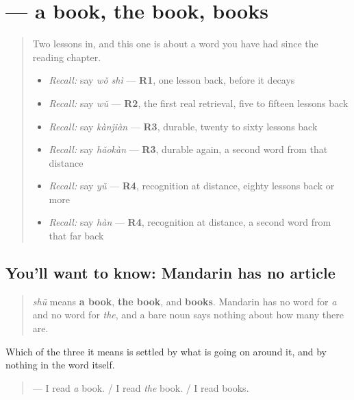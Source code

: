 \section[\texorpdfstring{\zh{书} (shū)}{书 (shū)}]{ — a book, the book, books}

\label{lesson:ZH-C22-wuguanci}



\begin{quote}
Two lessons in, and this one is about a word you have had since the reading chapter.

\begin{itemize}
\raggedright
  \item \emph{Recall:} say \emph{wǒ shì} — \textbf{R1}, one lesson back, before it decays
  \item \emph{Recall:} say \emph{wǔ} — \textbf{R2}, the first real retrieval, five to fifteen lessons back
  \item \emph{Recall:} say \emph{kànjiàn} — \textbf{R3}, durable, twenty to sixty lessons back
  \item \emph{Recall:} say \emph{hǎokàn} — \textbf{R3}, durable again, a second word from that distance
  \item \emph{Recall:} say \emph{yǔ} — \textbf{R4}, recognition at distance, eighty lessons back or more
  \item \emph{Recall:} say \emph{hàn} — \textbf{R4}, recognition at distance, a second word from that far back
\end{itemize}
\end{quote}

\subsection*{You'll want to know: Mandarin has no article}
\begin{quote}
\textbf{} \emph{shū} means \textbf{a book}, \textbf{the book}, and \textbf{books}. Mandarin has no word for \emph{a} and no word for \emph{the}, and a bare noun says nothing about how many there are.
\end{quote}

Which of the three it means is settled by what is going on around it, and by nothing in the word itself.

\begin{quote}
\textbf{} — I read \emph{a} book. / I read \emph{the} book. / I read books.
\end{quote}

